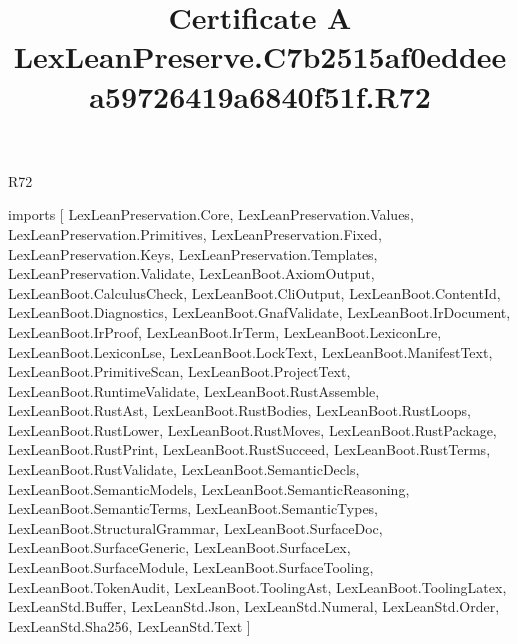 \begin{lexlean}{R72}
\title{Certificate A LexLeanPreserve.C7b2515af0eddeea59726419a6840f51f.R72}
\begin{coremodule}
imports [
  LexLeanPreservation.Core,
  LexLeanPreservation.Values,
  LexLeanPreservation.Primitives,
  LexLeanPreservation.Fixed,
  LexLeanPreservation.Keys,
  LexLeanPreservation.Templates,
  LexLeanPreservation.Validate,
  LexLeanBoot.AxiomOutput,
  LexLeanBoot.CalculusCheck,
  LexLeanBoot.CliOutput,
  LexLeanBoot.ContentId,
  LexLeanBoot.Diagnostics,
  LexLeanBoot.GnafValidate,
  LexLeanBoot.IrDocument,
  LexLeanBoot.IrProof,
  LexLeanBoot.IrTerm,
  LexLeanBoot.LexiconLre,
  LexLeanBoot.LexiconLse,
  LexLeanBoot.LockText,
  LexLeanBoot.ManifestText,
  LexLeanBoot.PrimitiveScan,
  LexLeanBoot.ProjectText,
  LexLeanBoot.RuntimeValidate,
  LexLeanBoot.RustAssemble,
  LexLeanBoot.RustAst,
  LexLeanBoot.RustBodies,
  LexLeanBoot.RustLoops,
  LexLeanBoot.RustLower,
  LexLeanBoot.RustMoves,
  LexLeanBoot.RustPackage,
  LexLeanBoot.RustPrint,
  LexLeanBoot.RustSucceed,
  LexLeanBoot.RustTerms,
  LexLeanBoot.RustValidate,
  LexLeanBoot.SemanticDecls,
  LexLeanBoot.SemanticModels,
  LexLeanBoot.SemanticReasoning,
  LexLeanBoot.SemanticTerms,
  LexLeanBoot.SemanticTypes,
  LexLeanBoot.StructuralGrammar,
  LexLeanBoot.SurfaceDoc,
  LexLeanBoot.SurfaceGeneric,
  LexLeanBoot.SurfaceLex,
  LexLeanBoot.SurfaceModule,
  LexLeanBoot.SurfaceTooling,
  LexLeanBoot.TokenAudit,
  LexLeanBoot.ToolingAst,
  LexLeanBoot.ToolingLatex,
  LexLeanStd.Buffer,
  LexLeanStd.Json,
  LexLeanStd.Numeral,
  LexLeanStd.Order,
  LexLeanStd.Sha256,
  LexLeanStd.Text
]


\end{coremodule}
\end{lexlean}
